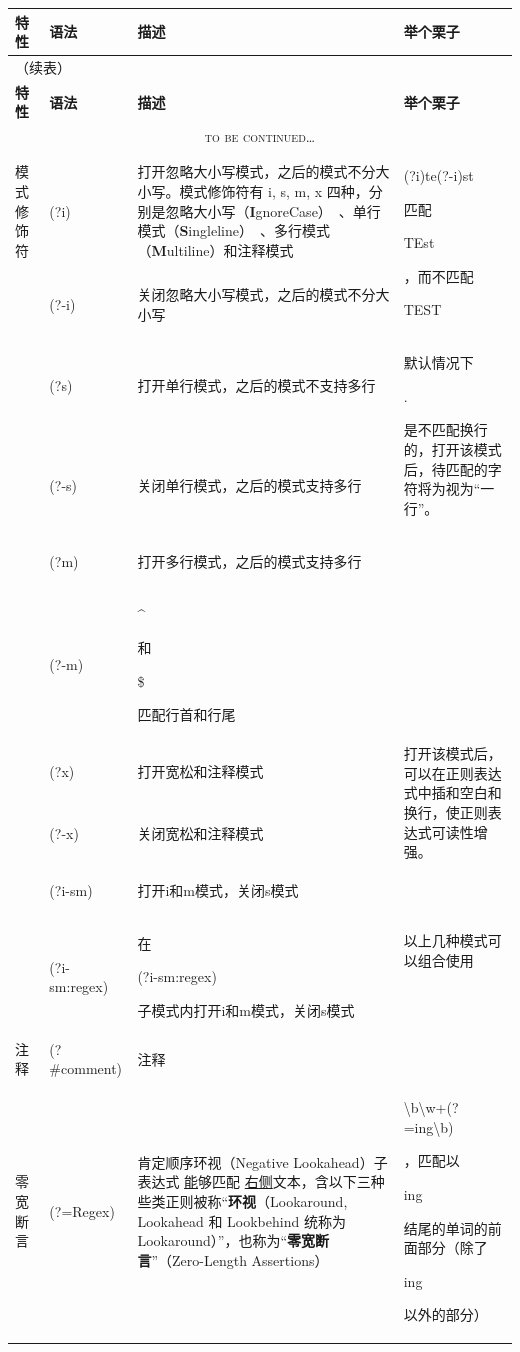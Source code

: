 \documentclass[12pt,a4paper,twoside]{ctexart}
\newcommand{\cbregex}[1]{\colorbox{orange!18}{\strut #1}}
\newcommand{\cbmatch}[1]{\colorbox{cyan!35}{\strut #1}}
\newcommand{\cbstring}[1]{\colorbox{green!20}{\strut #1}}
\begin{document}
\begin{center}

\begin{longtable}{p{4em}p{9em}p{25em}p{18em}}
  \toprule
  \textbf{特性} & \textbf{语法} & \textbf{描述} & \textbf{举个栗子} \\
  \midrule
  \endfirsthead
  \multicolumn{4}{l}{（续表）} \\
  \toprule
  \textbf{特性} & \textbf{语法} & \textbf{描述} & \textbf{举个栗子} \\
  \midrule
  \endhead
  \multicolumn{4}{c}{\textsc{to be continued}\ldots} \\[2ex]
  \endfoot
  \bottomrule
  \endlastfoot
  模式\newline{}修饰符 & \cbregex{(?i)} & 打开忽略大小写模式，之后的模式不分大小写。模式修饰符有 i, s, m, x 四种，分别是忽略大小写（\textbf{I}gnoreCase）~、单行模式（\textbf{S}ingleline）~、多行模式（\textbf{M}ultiline）和注释模式 & \multirow{2}{18em}{\cbregex{(?i)te(?-i)st} 匹配 \cbmatch{TEst}，而不匹配 \cbstring{TEST}} \\
  & \cbregex{(?-i)} & 关闭忽略大小写模式，之后的模式不分大小写 & \\
  & \cbregex{(?s)} & 打开单行模式，之后的模式不支持多行 & \multirow{2}{18em}{默认情况下\cbregex{.}是不匹配换行的，打开该模式后，待匹配的字符将为视为“一行”。} \\
  & \cbregex{(?-s)} & 关闭单行模式，之后的模式支持多行 & \\
  & \cbregex{(?m)} & 打开多行模式，之后的模式支持多行 & \\
  & \cbregex{(?-m)} & \cbregex{\^{}} 和 \cbregex{\$} 匹配行首和行尾 & \\
  & \cbregex{(?x)} & 打开宽松和注释模式 & \multirow{2}{18em}{打开该模式后，可以在正则表达式中插和空白和换行，使正则表达式可读性增强。} \\
  & \cbregex{(?-x)} & 关闭宽松和注释模式 & \\
  & \cbregex{(?i-sm)} & 打开i和m模式，关闭s模式 & \multirow{2}{18em}{以上几种模式可以组合使用} \\
  & \cbregex{(?i-sm:regex)} & 在\cbregex{(?i-sm:regex)} 子模式内打开i和m模式，关闭s模式 & \\
  \midrule
  注释 & (?\#comment) & 注释 & \\
  \midrule
  零宽断言 & (?=Regex) & 肯定顺序环视（Negative Lookahead）\newline{}子表达式 \underline{能}够匹配 \underline{右侧}文本，含以下三种些类正则被称“\textbf{环视}（Lookaround, Lookahead 和 Lookbehind 统称为 Lookaround）”，也称为“\textbf{零宽断言}”（Zero-Length Assertions） & \cbregex{\textbackslash{}b\textbackslash{}w+(?=ing\textbackslash{}b)}，匹配以\cbstring{ing}结尾的单词的前面部分（除了\cbstring{ing}以外的部分） \\

\end{longtable}
\end{center}
\end{document}
